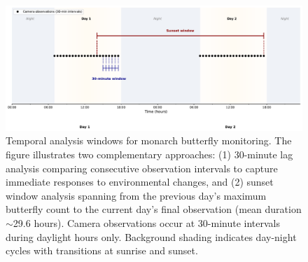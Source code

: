 \begin{figure}[ht]
    \centering
    \includegraphics[width=\textwidth]{figures/methods/temporal_windows.pdf}
    \caption{Temporal analysis windows for monarch butterfly monitoring. The figure illustrates two complementary approaches: (1) 30-minute lag analysis comparing consecutive observation intervals to capture immediate responses to environmental changes, and (2) sunset window analysis spanning from the previous day's maximum butterfly count to the current day's final observation (mean duration $\sim$29.6 hours). Camera observations occur at 30-minute intervals during daylight hours only. Background shading indicates day-night cycles with transitions at sunrise and sunset.}
    \label{fig:temporal-windows}
\end{figure}

